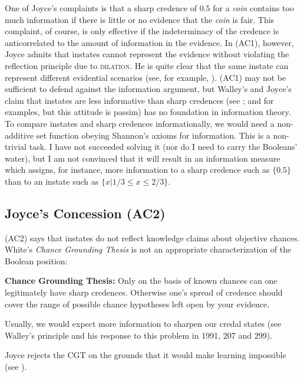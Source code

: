 \documentclass[11pt]{article}
\begin{document}
One of Joyce's complaints is that a sharp credence of $0.5$ for a
\textit{coin} contains too much information if there is little or no
evidence that the \textit{coin} is fair. This complaint, of course, is
only effective if the indeterminacy of the credence is anticorrelated
to the amount of information in the evidence. In (AC1), however, Joyce
admits that instates cannot represent the evidence without violating
the reflection principle due to \textsc{dilation}. He is quite clear
that the same instate can represent different evidential scenarios
(see, for example, ). (AC1) may not be
sufficient to defend against the information argument, but Walley's
and Joyce's claim that instates are less informative than sharp
credences (see ; and 
for examples, but this attitude is passim) has no foundation in
information theory. To compare instates and sharp credences
informationally, we would need a non-additive set function obeying
Shannon's axioms for information. This is a non-trivial task. I have
not succeeded solving it (nor do I need to carry the Booleans' water),
but I am not convinced that it will result in an information measure
which assigns, for instance, more information to a sharp credence such
as $\{0.5\}$ than to an instate such as $\{x|1/3\leq{}x\leq{}2/3\}$.

\subsection{Joyce's Concession (AC2)}
\label{jj2}

(AC2) says that instates do not reflect knowledge claims about
objective chances. White's \emph{Chance Grounding Thesis} is not an
appropriate characterization of the Boolean position:

\begin{quotex}
  \textbf{Chance Grounding Thesis:} Only on the basis of known chances
  can one legitimately have sharp credences. Otherwise one's spread of
  credence should cover the range of possible chance hypotheses left
  open by your evidence. 
\end{quotex}

Usually, we would expect more information to sharpen our credal states
(see Walley's 
principle and his response to this problem in
1991, 207 and 299).

Joyce rejects the CGT on the grounds that it would make learning
impossible (see ).
\end{document}
